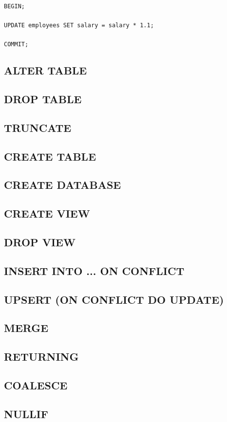 \documentclass[10pt]{article}
\begin{document}
\begin{verbatim}
BEGIN;

UPDATE employees SET salary = salary * 1.1;

COMMIT;
\end{verbatim}

\newpage 
\subsection{ALTER TABLE}
\subsection{DROP TABLE}
\subsection{TRUNCATE}
\subsection{CREATE TABLE}
\subsection{CREATE DATABASE}
\subsection{CREATE VIEW}
\subsection{DROP VIEW}
\subsection{INSERT INTO ... ON CONFLICT}
\subsection{UPSERT (ON CONFLICT DO UPDATE)}
\subsection{MERGE}
\subsection{RETURNING}
\subsection{COALESCE}
\subsection{NULLIF}
\end{document}
